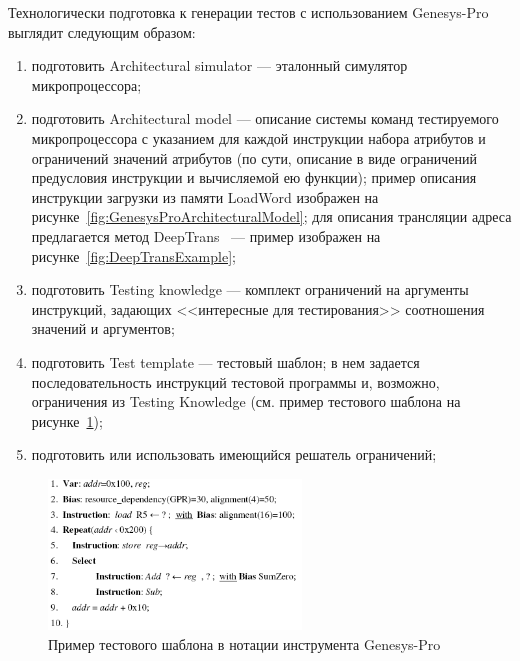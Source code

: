 Технологически подготовка к генерации тестов с использованием Genesys-Pro выглядит следующим образом:
\begin{enumerate}
    \item подготовить Architectural simulator --- эталонный симулятор микропроцессора;
    \item подготовить Architectural model --- описание системы команд тестируемого микропроцессора с указанием для каждой инструкции набора атрибутов и ограничений значений атрибутов (по сути, описание в виде ограничений предусловия инструкции и вычисляемой ею функции); пример описания инструкции загрузки из памяти LoadWord изображен на рисунке~\ref{fig:GenesysProArchitecturalModel}; для описания трансляции адреса предлагается метод DeepTrans~\cite{DeepTrans} --- пример изображен на рисунке~\ref{fig:DeepTransExample};
    \item подготовить Testing knowledge --- комплект ограничений на аргументы инструкций, задающих <<интересные для тестирования>> соотношения значений и аргументов;
    \item подготовить Test template --- тестовый шаблон; в нем задается последовательность инструкций тестовой программы и, возможно, ограничения из Testing Knowledge (см. пример тестового шаблона на рисунке~\ref{fig:genesysPro_template});
    \item подготовить или использовать имеющийся решатель ограничений;
\end{enumerate}

\begin{figure}[h] \center
  \includegraphics[width=0.6\textwidth]{4.analysis/genesys_tmpl}
  \caption{Пример тестового шаблона в нотации инструмента Genesys-Pro}\label{fig:genesysPro_template}
\end{figure}


